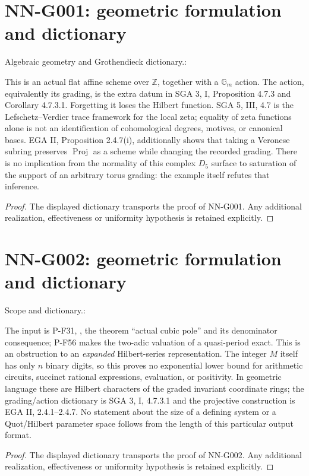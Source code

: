 \section{NN-G001: geometric formulation and dictionary}
\begin{geometricstatement}[NN-G001]
Algebraic geometry and Grothendieck dictionary.:

This is an actual flat affine scheme over $\mathbb Z$, together with a
$\mathbb G_m$ action. The action, equivalently its grading, is the
extra datum in SGA 3, I, Proposition 4.7.3 and Corollary 4.7.3.1.
Forgetting it loses the Hilbert function. SGA 5, III, 4.7 is the
Lefschetz--Verdier trace framework for the local zeta; equality of
zeta functions alone is not an identification of cohomological
degrees, motives, or canonical bases. EGA II, Proposition 2.4.7(i),
additionally shows that taking a Veronese subring preserves
$\operatorname{Proj}$ as a scheme while changing the recorded grading.
There is no implication from the normality of this complex $D_5$
surface to saturation of the support of an arbitrary torus grading:
the example itself refutes that inference.


\end{geometricstatement}
\begin{proof} The displayed dictionary transports the proof of NN-G001. Any additional realization, effectiveness or uniformity hypothesis is retained explicitly.\end{proof}


\section{NN-G002: geometric formulation and dictionary}
\begin{geometricstatement}[NN-G002]
Scope and dictionary.:

The input is P-F31, ,
the theorem ``actual cubic pole'' and its denominator consequence;
P-F56 makes the two-adic valuation of a quasi-period exact. This is
an obstruction to an \emph{expanded} Hilbert-series representation.
The integer $M$ itself has only $n$ binary digits, so this proves no
exponential lower bound for arithmetic circuits, succinct rational
expressions, evaluation, or positivity. In geometric language these
are Hilbert characters of the graded invariant coordinate rings;
the grading/action dictionary is SGA 3, I, 4.7.3.1 and the projective
construction is EGA II, 2.4.1--2.4.7. No statement about the size of
a defining system or a Quot/Hilbert parameter space follows from
the length of this particular output format.


\end{geometricstatement}
\begin{proof} The displayed dictionary transports the proof of NN-G002. Any additional realization, effectiveness or uniformity hypothesis is retained explicitly.\end{proof}


